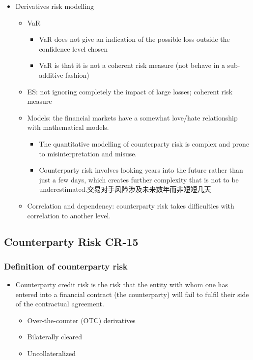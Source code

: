 \begin{itemize}
\item Derivatives risk modelling
\begin{itemize}
    \item VaR
    \begin{itemize}
        \item VaR does not give an indication of the possible loss outside the confidence level chosen
        \item VaR is that it is not a coherent risk measure (not behave in a sub-additive fashion)
    \end{itemize}
    \item ES: not ignoring completely the impact of large losses; coherent risk measure
    \item Models: the financial markets have a somewhat love/hate relationship with mathematical models.
    \begin{itemize}
        \item The quantitative modelling of counterparty risk is complex and prone to misinterpretation and misuse.
        \item Counterparty risk involves looking years into the future rather than just a few days, which creates further complexity that is not to be underestimated.交易对手风险涉及未来数年而非短短几天
    \end{itemize}
    \item Correlation and dependency: counterparty risk takes
    difficulties with correlation to another level.
\end{itemize}



\end{itemize}


\subsection{Counterparty Risk CR-15}


\subsubsection{Definition of counterparty risk}
\begin{itemize}
 \item Counterparty credit risk is the risk that the entity with whom one has entered into a financial contract (the counterparty) will fail to fulfil their side of the contractual agreement.
 \begin{itemize}
    \item Over-the-counter (OTC) derivatives
    \item Bilaterally cleared
    \item Uncollateralized
 \end{itemize}
\end{itemize}

